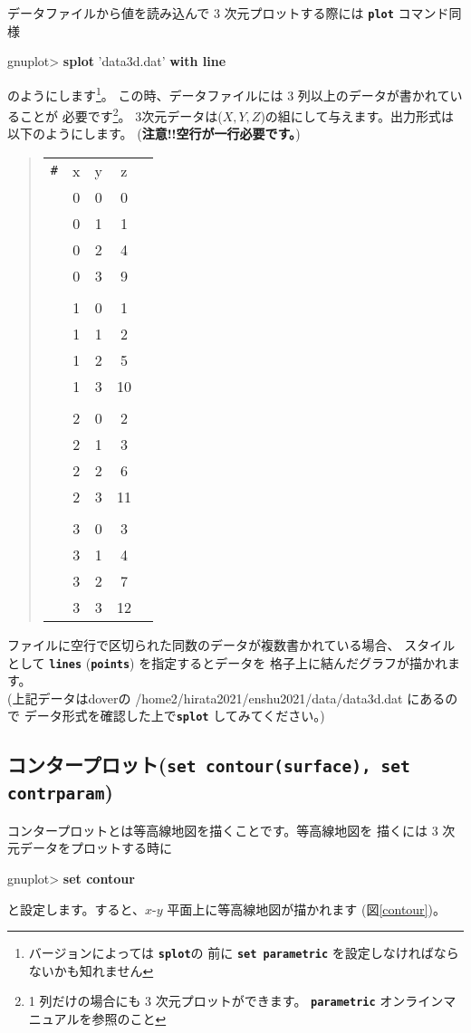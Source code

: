 \documentclass[a4j]{ujarticle} %
\newenvironment{terminal}{%
  \begin{center}
   \begin{minipage}{.8\textwidth}
    \setlength{\FrameSep}{.5\FrameSep}%
    \begin{framed}\ttfamily\small%
     \setlength\baselineskip{.85\baselineskip}%
}{%
    \end{framed}
   \end{minipage}
  \end{center}%
}
\begin{document}
データファイルから値を読み込んで 3 次元プロットする際には
{\tt\bf plot} コマンド同様
\begin{terminal}
gnuplot> {\bf splot} 'data3d.dat' {\bf with line}
\end{terminal}
のようにします\footnote{バージョンによっては {\tt\bf splot}の
前に {\tt\bf set parametric} を設定しなければならないかも知れません}。
この時、データファイルには 3 列以上のデータが書かれていることが
必要です\footnote{1 列だけの場合にも 3 次元プロットができます。
{\tt\bf parametric} オンラインマニュアルを参照のこと}。
3次元データは($X,Y,Z$)の組にして与えます。出力形式は以下のようにします。
(\textbf{注意!!空行が一行必要です。})
\begin{quote}
 \renewcommand{\arraystretch}{0.7}
\begin{tabular}{lcccc}
{\tt \#} & x & y & z & \\
&  0 & 0 & 0 \\
&  0 & 1 & 1 \\
&  0 & 2 & 4 \\
&  0 & 3 & 9 \\
\\
&  1 & 0 & 1 \\
&  1 & 1 & 2 \\
&  1 & 2 & 5 \\
&  1 & 3 & 10 \\
\\
&  2 & 0 & 2 \\
&  2 & 1 & 3 \\
&  2 & 2 & 6 \\
&  2 & 3 & 11 \\
\\
&  3 & 0 & 3 \\
&  3 & 1 & 4 \\
&  3 & 2 & 7 \\
&  3 & 3 & 12 \\
\end{tabular}
\end{quote}

ファイルに空行で区切られた同数のデータが複数書かれている場合、
スタイルとして {\tt\bf lines} ({\tt\bf points}) を指定するとデータを
格子上に結んだグラフが描かれます。\\
(上記データはdoverの /home2/hirata2021/enshu2021/data/data3d.dat にあるので
データ形式を確認した上で{\tt\bf splot} してみてください。)

\subsection{コンタープロット({\tt\bf set contour(surface), set contrparam})}
コンタープロットとは等高線地図を描くことです。等高線地図を
描くには 3 次元データをプロットする時に
\begin{terminal}
gnuplot> {\bf set contour}
\end{terminal}
と設定します。すると、$x$-$y$ 平面上に等高線地図が描かれます
(図\ref{contour})。
\end{document}
